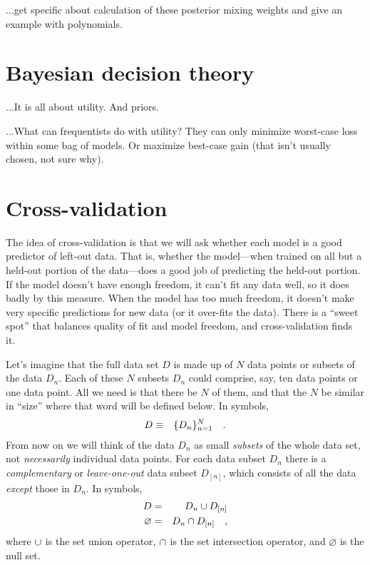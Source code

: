 \documentclass[12pt,twoside]{article}
\newcommand{\data}{D}
\begin{document}
...get specific about calculation of these posterior mixing weights
and give an example with polynomials.

\section{Bayesian decision theory}

...It is all about utility.  And priors.

...What can frequentists do with utility?  They can only minimize
worst-case loss within some bag of models.  Or maximize best-case
gain (that isn't usually chosen, not sure why).

\section{Cross-validation}

The idea of cross-validation is that we will ask whether each model is
a good predictor of left-out data.  That is, whether the model---when
trained on all but a held-out portion of the data---does a good job of
predicting the held-out portion.  If the model doesn't have enough
freedom, it can't fit any data well, so it does badly by this measure.
When the model has too much freedom, it doesn't make very specific
predictions for new data (or it over-fits the data).  There is a
``sweet spot'' that balances quality of fit and model freedom, and
cross-validation finds it.

Let's imagine that the full data set $\data$ is made up of $N$ data
points or subsets of the data $D_n$.  Each of these $N$ subsets $D_n$
could comprise, say, ten data points or one data point.  All we need
is that there be $N$ of them, and that the $N$ be similar in ``size''
where that word will be defined below.  In symbols,
\begin{eqnarray}
\data &\equiv& \setofall{\data_n}{n=1}{N}
\quad.
\end{eqnarray}
From now on we will think of the data $\data_n$ as small
\emph{subsets} of the whole data set, not \emph{necessarily}
individual data points.  For each data subset $\data_n$ there is a
\emph{complementary} or \emph{leave-one-out} data subset
$\data_{[n]}$, which consists of all the data \emph{except} those in
$\data_n$.  In symbols,
\begin{eqnarray}
\data &=& \data_n \union \data_{[n]}
\\
\varnothing &=& \data_n \intersect \data_{[n]}
\quad,
\end{eqnarray}
where $\cup$ is the set union operator, $\cap$ is the set
intersection operator, and $\varnothing$ is the null set.
\end{document}
